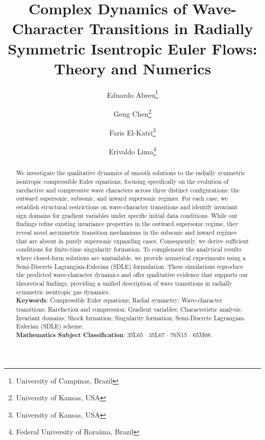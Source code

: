 \documentclass[11pt]{article}
\title{Complex Dynamics of Wave-Character Transitions in Radially Symmetric Isentropic Euler Flows: Theory and Numerics}
\author{
Eduardo Abreu\thanks{University of Campinas, Brazil}
\and Geng Chen\thanks{University of Kansas, USA}
\and Faris El-Katri\thanks{University of Kansas, USA}
\and Erivaldo Lima\thanks{Federal University of Roraima, Brazil}
}
\date{}
\begin{document}
\maketitle


\begin{abstract}
We investigate the qualitative dynamics of smooth solutions to the radially 
symmetric isentropic compressible Euler equations, focusing specifically on 
the evolution of rarefactive and compressive wave characters across three 
distinct configurations: the outward supersonic, subsonic, and inward 
supersonic regimes. For each case, we establish structural restrictions on 
wave-character transitions and identify invariant sign domains for gradient 
variables under specific initial data conditions. While our findings refine 
existing invariance properties in the outward supersonic regime, they reveal 
novel asymmetric transition mechanisms in the subsonic and inward regimes 
that are absent in purely supersonic expanding cases. Consequently, we derive 
sufficient conditions for finite-time singularity formation. To complement 
the analytical results where closed-form solutions are unavailable, we provide 
numerical experiments using a Semi-Discrete Lagrangian-Eulerian (SDLE) 
formulation. These simulations reproduce the predicted wave-character dynamics 
and offer qualitative evidence that supports our theoretical findings, 
providing a unified description of wave transitions in radially symmetric 
isentropic gas dynamics. \\

\noindent
\textbf{Keywords}: Compressible Euler equations; Radial symmetry; 
Wave-character transitions; Rarefaction and compression; Gradient variables; 
Characteristic analysis; Invariant domains; Shock formation; Singularity formation; 
Semi-Discrete Lagrangian-Eulerian (SDLE) scheme.\\

\noindent
\textbf{Mathematics Subject Classification}: 35L65 $\cdot$ 35L67 $\cdot$ 76N15 $\cdot$ 65M08.


\end{abstract}
\end{document}
